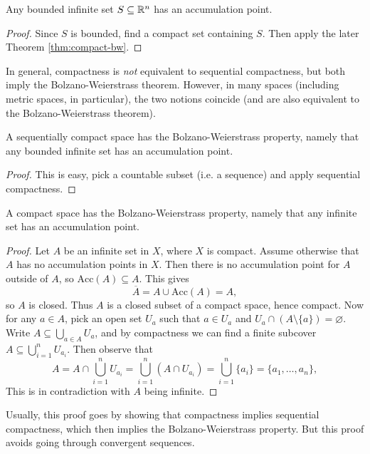 \begin{theorem}
  Any bounded infinite set $S \subseteq \mathbb{R}^n$ has an
  accumulation point.
\end{theorem}

\begin{proof}
  Since $S$ is bounded, find a compact set containing
  $S$. Then apply the later Theorem \ref{thm:compact-bw}.
\end{proof}

\begin{remark}
  In general,
  compactness is \emph{not} equivalent to sequential
  compactness, but both imply the Bolzano-Weierstrass
  theorem. However, in many spaces (including
  metric spaces, in particular), the two notions coincide (and are
  also equivalent to the Bolzano-Weierstrass theorem).
\end{remark}

\begin{theorem}
  A sequentially compact space has the Bolzano-Weierstrass
  property, namely that any bounded infinite set has an
  accumulation point.
\end{theorem}

\begin{proof}
  This is easy, pick a countable subset
  (i.e. a sequence)
  and apply sequential compactness.
\end{proof}

\begin{theorem}
  \label{thm:compact-bw}
  A compact space has the Bolzano-Weierstrass property, namely
  that any infinite set has an accumulation point.
\end{theorem}

\begin{proof}
  Let $A$ be an infinite set in $X$, where $X$ is compact.
  Assume otherwise that $A$ has no accumulation points in $X$.
  Then there is no accumulation point for $A$
  outside of $A$, so $\mathrm{Acc}(A) \subseteq A$. This
  gives
  \[
    \overline{A} = A \cup \mathrm{Acc}(A) = A,
  \]
  so $A$ is closed. Thus $A$ is a closed subset
  of a compact space, hence compact. Now for
  any $a \in A$, pick an open set $U_a$
  such that $a \in U_a$ and
  $U_a \cap (A \setminus \{a\}) = \varnothing$.
  Write $A \subseteq \bigcup_{a \in A} U_a$, and
  by compactness we can find a finite
  subcover $A \subseteq \bigcup_{i = 1}^n U_{a_i}$.
  Then observe that
  \[
    A = A \cap \bigcup_{i = 1}^n U_{a_i}
    = \bigcup_{i = 1}^n (A \cap U_{a_i})
    = \bigcup_{i = 1}^n \{a_i\}
    = \{a_1, \ldots, a_n\},
  \]
  This is in contradiction with $A$ being infinite.
\end{proof}

\begin{remark}
  Usually, this proof goes by showing that compactness
  implies sequential compactness, which then
  implies the Bolzano-Weierstrass property.
  But this proof avoids going through convergent
  sequences.
\end{remark}
